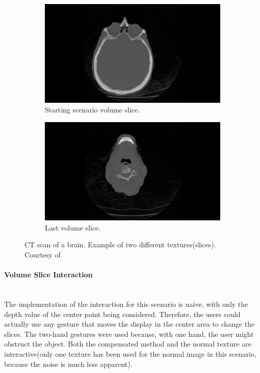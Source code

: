 \documentclass[]{article}
\begin{document}
\begin{figure}[!hbtp]
\centering
\begin{subfigure}{.5\textwidth}
  \centering
  \includegraphics[width=0.9\linewidth]{figures/brain_043.jpg}
  \caption{Starting scenario volume slice.}
  \label{fig:StartBrainSlice}
\end{subfigure}%
\begin{subfigure}{.5\textwidth}
  \centering
  \includegraphics[width=0.9\linewidth]{figures/brain_098.jpg}
  \caption{Last volume slice.}
  \label{fig:EndBrainSlice}
\end{subfigure}
\caption{CT scan of a brain. Example of two different textures(slices). Courtesy of \cite{levoy2001}}
\label{fig:BrainSlices}
\end{figure}

\paragraph{Volume Slice Interaction}\mbox{}\\

The implementation of the interaction for this scenario is naive, with only the depth value of the center point being considered. Therefore, the users could actually use any gesture that moves the display in the center area to change the slices. The two-hand gestures were used because, with one hand, the user might obstruct the object. Both the compensated method and the normal texture are interactive(only one texture has been used for the normal image in this scenario, because the noise is much less apparent).
\end{document}
